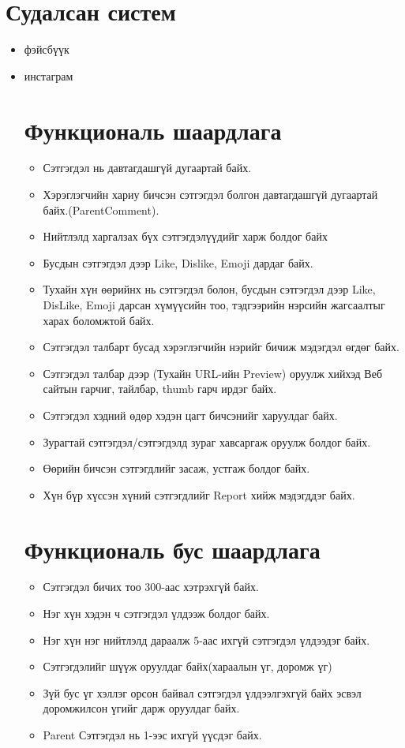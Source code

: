 \documentclass[12pt]{article}
\begin{document}
	\section{Судалсан систем}
	\begin{itemize}
		\item фэйсбүүк
		\item инстаграм
		\section{Функциональ шаардлага}	
		\begin{itemize}
			\item Сэтгэгдэл нь давтагдашгүй дугаартай байх.
			\item Хэрэглэгчийн хариу бичсэн сэтгэгдэл болгон давтагдашгүй дугаартай байх.(ParentComment).
			\item Нийтлэлд харгалзах бүх сэтгэгдэлүүдийг харж болдог байх
			\item Бусдын сэтгэгдэл дээр Like, Dislike, Emoji дардаг байх.
			\item Тухайн хүн өөрийнх нь сэтгэгдэл болон, бусдын сэтгэгдэл дээр Like, DisLike, Emoji дарсан хүмүүсийн тоо, тэдгээрийн нэрсийн жагсаалтыг харах боломжтой байх.
			\item Сэтгэгдэл талбарт бусад хэрэглэгчийн нэрийг бичиж мэдэгдэл өгдөг байх. 
			\item Сэтгэгдэл талбар дээр (Тухайн URL-ийн Preview) оруулж хийхэд Веб сайтын гарчиг, тайлбар, thumb гарч ирдэг байх.
			\item Сэтгэгдэл хэдний өдөр хэдэн цагт бичсэнийг харуулдаг байх.
			\item Зурагтай сэтгэгдэл/сэтгэгдэлд зураг хавсаргаж оруулж болдог байх.
			\item Өөрийн бичсэн сэтгэгдлийг засаж, устгаж болдог байх.
			\item Хүн бүр хүссэн хүний сэтгэгдлийг Report хийж мэдэгддэг байх.
		\end{itemize}
		
		
		
		\section{Функциональ бус шаардлага}
		\begin{itemize}
			\item Сэтгэгдэл бичих тоо 300-аас хэтрэхгүй байх.
			\item Нэг хүн хэдэн ч сэтгэгдэл үлдээж болдог байх.
			\item Нэг хүн нэг нийтлэлд дараалж 5-аас ихгүй сэтгэгдэл үлдээдэг байх.
			\item Сэтгэгдэлийг шүүж оруулдаг байх(хараалын үг, доромж үг)
			\item Зүй бус үг хэллэг орсон байвал сэтгэгдэл үлдээлгэхгүй байх эсвэл доромжилсон үгийг дарж оруулдаг байх.
			\item Parent Сэтгэгдэл нь 1-ээс ихгүй үүсдэг байх.
		\end{itemize}
	\end{itemize}
	
\end{document}
